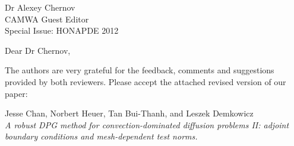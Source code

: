 \documentclass{letter}
\begin{document}
\begin{letter}{Dr Alexey Chernov\\CAMWA Guest Editor\\Special Issue: HONAPDE 2012}


\opening{Dear Dr Chernov,}

The authors are very grateful for the feedback, comments and suggestions provided by both reviewers.  Please accept the attached revised version of our paper: 

\begin{center}
Jesse Chan, Norbert Heuer, Tan Bui-Thanh, and Leszek Demkowicz\\
\textit{A robust DPG method for convection-dominated diffusion problems II: adjoint boundary conditions and mesh-dependent test norms.}
\end{center}


\end{letter}
\end{document}

